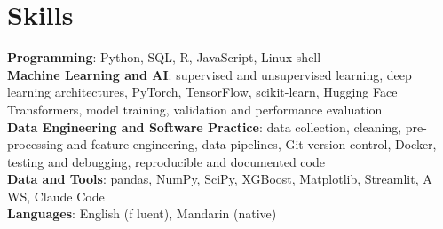 \documentclass[letterpaper,11pt]{article}
\begin{document}
\section{\textbf{Skills}}
 \begin{itemize}[leftmargin=0.15in, label={}]
    \small{\item{
     \textbf{Programming}{: Python, SQL, R, JavaScript, Linux shell} \\
     \textbf{Machine Learning and AI}{: supervised and unsupervised learning, deep learning architectures, PyTorch, TensorFlow, scikit-learn, Hugging Face Transformers, model training, validation and performance evaluation} \\
     \textbf{Data Engineering and Software Practice}{: data collection, cleaning, pre-processing and feature engineering, data pipelines, Git version control, Docker, testing and debugging, reproducible and documented code} \\
     \textbf{Data and Tools}{: pandas, NumPy, SciPy, XGBoost, Matplotlib, Streamlit, A\kern0pt WS, Claude Code} \\
     \textbf{Languages}{: English (f\kern0pt luent), Mandarin (native)}}}

 \end{itemize}
\end{document}
